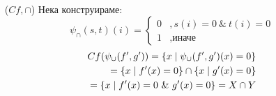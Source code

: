 \begin{solution}
\begin{itemize}
\begin{equation}
\begin{split}
                  \end{split}
              \end{equation}
        \item[($Cf, \cap$)] Нека конструираме:
              \begin{equation}
                  \psi_\cap(s, t)(i) = \begin{cases}
                      0 & , s(i) = 0\ \&\ t(i) = 0 \\
                      1 & , \text{иначе}
                  \end{cases}
              \end{equation}
              \begin{equation}
                  \begin{split}
                      Cf(\psi_\cup(f', g')) = \left\{x \mid \psi_\cup(f', g')(x) = 0\right\} \\
                      = \left\{x \mid f'(x) = 0 \right\} \cap \left\{x \mid g'(x) = 0\right\}         \\
                      = \left\{x \mid f'(x) = 0\ \&\ g'(x) = 0\right\} = X \cap Y
                  \end{split}
              \end{equation}
    \end{itemize}
\end{solution}

